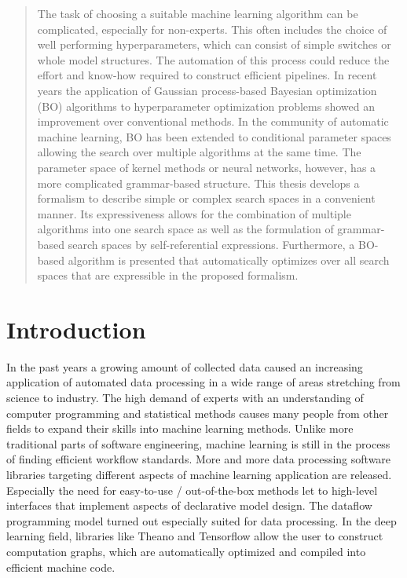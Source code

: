 \documentclass[english]{article}
\begin{document}
\begin{abstract}
The task of choosing a suitable machine learning algorithm can be complicated, especially for non-experts. This often includes the choice of well performing hyperparameters, which can consist of simple switches or whole model structures. The automation of this process could reduce the effort and know-how required to construct efficient pipelines. In recent years the application of Gaussian process-based Bayesian optimization (BO) algorithms to hyperparameter optimization problems showed an improvement over conventional methods. In the community of automatic machine learning, BO has been extended to conditional parameter spaces allowing the search over multiple algorithms at the same time. The parameter space of kernel methods or neural networks, however, has a more complicated grammar-based structure. This thesis develops a formalism to describe simple or complex search spaces in a convenient manner. Its expressiveness allows for the combination of multiple algorithms into one search space as well as the formulation of grammar-based search spaces by self-referential expressions. Furthermore, a BO-based algorithm is presented that automatically optimizes over all search spaces that are expressible in the proposed formalism.
\end{abstract}



\section{Introduction}
In the past years a growing amount of collected data caused an increasing application of automated data processing in a wide range of areas stretching from  science to industry.
The high demand of experts with an understanding of computer programming and statistical methods causes many people from other fields to expand their skills into machine learning methods. Unlike more traditional parts of software engineering, machine learning is still in the process of finding efficient workflow standards. More and more data processing software libraries targeting different aspects of machine learning application are released. Especially the need for easy-to-use / out-of-the-box methods let to high-level interfaces that implement aspects of declarative model design. The dataflow programming model turned out especially suited for data processing. In the deep learning field, libraries like Theano and Tensorflow allow the user to construct computation graphs, which are automatically optimized and compiled into efficient machine code.
\end{document}
